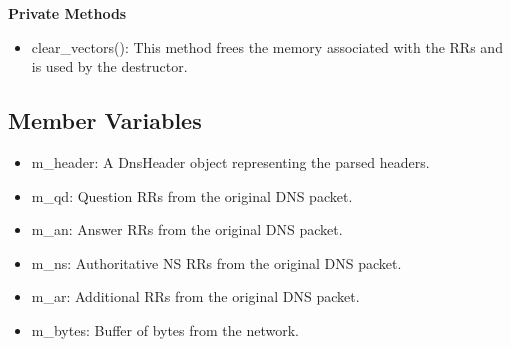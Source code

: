 {\bf Private Methods}
\begin{itemize}
\item clear\_vectors(): This method frees the memory associated with the RRs and is used by the destructor.
\end{itemize}

\subsection{Member Variables}
\begin{itemize}
\item m\_header: A DnsHeader object representing the parsed headers.
\item m\_qd: Question RRs from the original DNS packet.
\item m\_an: Answer RRs from the original DNS packet.
\item m\_ns: Authoritative NS RRs from the original DNS packet.
\item m\_ar: Additional RRs from the original DNS packet.
\item m\_bytes: Buffer of bytes from the network.
\end{itemize}
